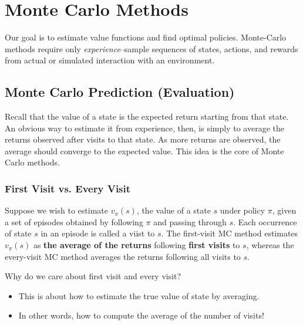 \chapter{Monte Carlo Methods}
Our goal is to estimate value functions and find optimal policies. Monte-Carlo methods require only \textit{experience}--sample sequences of states, actions, and rewards from actual or simulated interaction with an environment. 

\section{Monte Carlo Prediction (Evaluation)}
Recall that the value of a state is the expected return starting from that state. An obvious way to estimate it from experience, then, is simply to average the returns observed after visits to that state. As more returns are observed, the average should converge to the expected value. This idea is the core of Monte Carlo methods. 

\subsection{First Visit vs. Every Visit}
Suppose we wish to estimate $v_\pi(s)$, the value of a state $s$ under policy $\pi$, given a set of episodes obtained by following $\pi$ and passing through $s$. Each occurrence of state $s$ in an episode is called a viist to $s$. The first-visit MC method estimates $v_\pi(s)$ as \textbf{the average of the returns} following \textbf{first visits} to $s$, whereas the every-visit MC method averages the returns following all visits to $s$.

Why do we care about first visit and every visit?
\begin{itemize}
	\item This is about how to estimate the true value of state by averaging.
	\item In other words, how to compute the average of the number of visits!
\end{itemize}

